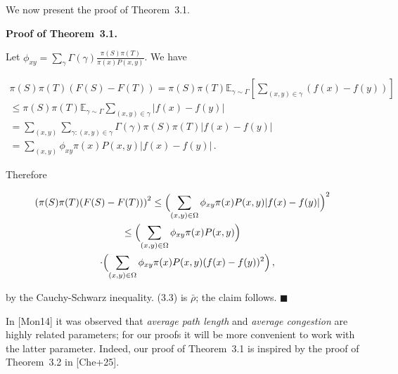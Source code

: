 


We now present the proof of Theorem 3.1.\par




\par\medskip\noindent\textbf{Proof of Theorem 3.1.}\par



Let $\phi_{xy}=\sum_{\gamma}\Gamma(\gamma)\frac{\pi(S)\pi(T)}{\pi(x)P(x,y)}$. We have\par


\[\begin{gathered}
\displaystyle\pi(S)\pi(T)(F(S)-F(T)) \displaystyle=\pi(S)\pi(T)\mathbb{E}_{\gamma\sim\Gamma}\left[\sum_{(x,y)\in\gamma}(f(x)-f(y))\right] \\
\displaystyle\leq\pi(S)\pi(T)\mathbb{E}_{\gamma\sim\Gamma}\sum_{(x,y)\in\gamma}|f(x)-f(y)| \\
\displaystyle=\sum_{(x,y)}\sum_{\gamma:(x,y)\in\gamma}\Gamma(\gamma)\pi(S)\pi(T)|f(x)-f(y)| \\
\displaystyle=\sum_{(x,y)}\phi_{xy}\pi(x)P(x,y)|f(x)-f(y)|\,.
\end{gathered}\]




Therefore\par


\[\begin{gathered}
\displaystyle\left(\pi(S)\pi(T)(F(S)-F(T))\right)^{2} \displaystyle\leq\Bigl(\sum_{(x,y)\in\Omega}\phi_{xy}\pi(x)P(x,y)|f(x)-f(y)|\Bigr)^{2} \\
\displaystyle\leq\Bigl(\sum_{(x,y)\in\Omega}\phi_{xy}\pi(x)P(x,y)\Bigr) \\
\displaystyle\quad\cdot\Bigl(\sum_{(x,y)\in\Omega}\phi_{xy}\pi(x)P(x,y)(f(x)-f(y))^{2}\Bigr)\,,
\end{gathered}\]


by the Cauchy-Schwarz inequality. (3.3) is $\bar{\rho}$; the claim follows.
\ensuremath{\blacksquare}\par





In [Mon14] it was observed that \emph{average path length} and \emph{average congestion} are highly related parameters; for our proofs it will be more convenient to work with the latter parameter. Indeed, our proof of Theorem 3.1 is inspired by the proof of Theorem 3.2 in [Che+25].\par




